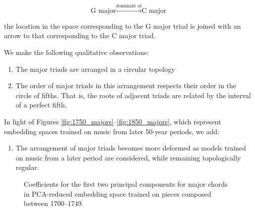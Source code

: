 $$\textrm{G major} \xrightarrow{\textrm{dominant of}} \textrm{C major}$$

the location in the space corresponding to the G major triad is joined with an arrow to that corresponding to the C major triad.  

We make the following qualitative observations:
\begin{enumerate}
\item The major triads are arranged in a circular topology
\item The order of major triads in this arrangement respects their order in the circle of fifths. That is, the roots of adjacent triads are related by the interval of a perfect fifth.
\end{enumerate}
In light of Figures \ref{fig:1750_majors}--\ref{fig:1850_majors}, which represent embedding spaces trained on music from later 50-year periods, we add:
\begin{enumerate}[resume]
\item The arrangement of major triads becomes more deformed as models trained on music from a later period are considered, while remaining topologically regular.
\end{enumerate}


\begin{figure}
 \centerline{}
 \caption{Coefficients for the first two principal components for major chords in PCA-reduced embedding space trained on pieces composed between 1700--1749.}
 \label{fig:1700_majors}
\end{figure}

